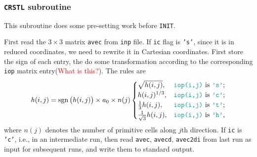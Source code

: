 
\subsubsection{\texttt{CRSTL} subroutine}
\label{sssec:crstl}

This subroutine does some pre-setting work before \texttt{INIT}.

First read the $3 \times 3$ matrix \texttt{avec} from \texttt{inp} file.
If \texttt{ic} flag is \texttt{'s'},
since it is in reduced coordinates, we need to rewrite it in Cartesian
coordinates. First store the sign of each entry, the do some transformation according to
the corresponding \texttt{iop} matrix entry(\textcolor{red}{What is this?}). The
rules are
\begin{equation}\label{eq:crstltrans}
 h(i, j) = \sign \big( h(i, j) \big) \times a_0 \times n(j)
 \begin{cases}
  \sqrt{h(i, j)},                 & \text{\texttt{iop(i,j)} is \texttt{'s'};} \\
  h(i, j)^{1/3},                  & \text{\texttt{iop(i,j)} is \texttt{'c'};} \\
  \frac{ 1 }{ 3 } h(i, j),        & \text{\texttt{iop(i,j)} is \texttt{'t'};} \\
  \frac{ 1 }{ \sqrt{3} } h(i, j), & \text{\texttt{iop(i,j)} is \texttt{'h'},}
 \end{cases}
\end{equation}
where $n(j)$ denotes the number of primitive cells along $j$th direction.
If \texttt{ic} is \texttt{'c'}, i.e., in an intermediate run,
then read \texttt{avec}, \texttt{avecd}, \texttt{avec2di} from last run as
input for subsequent runs, and write them to standard output.

